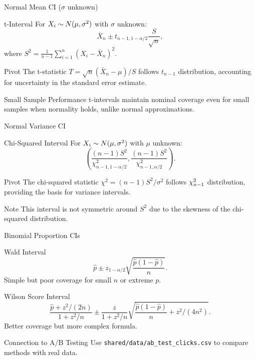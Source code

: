 \begin{frame}{Normal Mean CI ($\sigma$ unknown)}
  \begin{block}{t-Interval}
    For $X_i \sim N(\mu, \sigma^2)$ with $\sigma$ unknown:
    \[\bar{X}_n \pm t_{n-1, 1-\alpha/2} \frac{S}{\sqrt{n}},\]
    where $S^2 = \frac{1}{n-1} \sum_{i=1}^n (X_i - \bar{X}_n)^2$.
  \end{block}

  \begin{block}{Pivot}
    The t-statistic $T = \sqrt{n}(\bar{X}_n - \mu)/S$ follows $t_{n-1}$ distribution,
    accounting for uncertainty in the standard error estimate.
  \end{block}

  \begin{block}{Small Sample Performance}
    t-intervals maintain nominal coverage even for small samples when
    normality holds, unlike normal approximations.
  \end{block}
\end{frame}

\begin{frame}{Normal Variance CI}
  \begin{block}{Chi-Squared Interval}
    For $X_i \sim N(\mu, \sigma^2)$ with $\mu$ unknown:
    \[\left( \frac{(n-1)S^2}{\chi^2_{n-1, 1-\alpha/2}}, \frac{(n-1)S^2}{\chi^2_{n-1, \alpha/2}} \right).\]
  \end{block}

  \begin{block}{Pivot}
    The chi-squared statistic $\chi^2 = (n-1)S^2 / \sigma^2$ follows $\chi^2_{n-1}$
    distribution, providing the basis for variance intervals.
  \end{block}

  \begin{block}{Note}
    This interval is not symmetric around $S^2$ due to the skewness
    of the chi-squared distribution.
  \end{block}
\end{frame}

\begin{frame}{Binomial Proportion CIs}
  \begin{block}{Wald Interval}
    \[\hat{p} \pm z_{1-\alpha/2} \sqrt{\frac{\hat{p}(1-\hat{p})}{n}}.\]
    Simple but poor coverage for small $n$ or extreme $p$.
  \end{block}

  \begin{block}{Wilson Score Interval}
    \[ \frac{\hat{p} + z^2/(2n)}{1 + z^2/n} \pm \frac{z}{1 + z^2/n} \sqrt{\frac{\hat{p}(1-\hat{p})}{n} + z^2/(4n^2)}. \]
    Better coverage but more complex formula.
  \end{block}

  \begin{block}{Connection to A/B Testing}
    Use \texttt{shared/data/ab\_test\_clicks.csv} to compare methods with real data.
  \end{block}
\end{frame}

